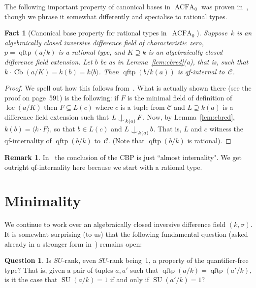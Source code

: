 \documentclass[\DocOpts]{amsart}
\newtheorem{fact}[theorem]{Fact}
\theoremstyle{definition}
\newtheorem{remark}[theorem]{Remark}
\newtheorem{question}[theorem]{Question}
\def\acfa{\operatorname{ACFA}}
\def\cb{\operatorname{Cb}}
\def\qftp{\operatorname{qftp}}
\def\loc{\operatorname{loc}}
\def\su{\operatorname{SU}}
\def\C{\mathcal{C}}
\newcommand{\<}{\langle}
\renewcommand{\>}{\rangle}
\def\Ind#1#2{#1\setbox0=\hbox{\(#1x\)}\kern\wd0\hbox to 
0pt{\hss\(#1\mid\)\hss}\lower.9\ht0\hbox to 
0pt{\hss\(#1\smile\)\hss}\kern\wd0}
\def\ind{\mathop{\mathpalette\Ind{}}}
\begin{document}
The following important property of canonical bases in $\acfa_0$ was proven in~\cite{pillay-ziegler}, though we phrase it somewhat differently and specialise to rational types.

\begin{fact}[Canonical base property for rational types in~$\acfa_0$]
\label{fact:cbp}
Suppose~$k$ is an algebraically closed inversive difference field of characteristic zero, $p=\qftp(a/k)$ is a rational type, and $K\supseteq k$ is an algebraically closed difference field extension.
Let $b$ be as in Lemma~\ref{lem:cbred}(a), that is, such that
$k\cdot\cb(a/K)=k(b)=k\langle b\rangle$.
Then $\qftp(b/k(a))$ is qf-internal to~$\C$.
\end{fact}

\begin{proof}
We spell out how this follows from~\cite[Theorem~1.2]{pillay-ziegler}.
What is actually shown there (see the proof on page~591) is the following: if $F$ is the minimal field of definition of $\loc(a/K)$ then $F\subseteq L(c)$ where $c$ is a tuple from $\C$ and $L\supseteq k(a)$ is a difference field extension such that $L\ind_{k(a)}F$.
Now, by Lemma~\ref{lem:cbred}, $k(b)=\langle k\cdot F\rangle$, so that $b\in L(c)$ and $L\ind_{k(a)}b$.
That is, $L$ and $c$ witness the qf-internality of $\qftp(b/k)$ to~$\C$.
(Note that $\qftp(b/k)$ is rational).
\end{proof}

\begin{remark}
In~\cite{pillay-ziegler} the conclusion of the CBP is just ``almost internality".
We get outright qf-internality here because we start with a rational type.
\end{remark}

\bigskip
\section{Minimality}
\label{sect:qfmin}

\noindent
We continue to work over an algebraically closed inversive difference field $(k,\sigma)$.
It is somewhat surprising (to us) that the following fundamental question (asked already in a stronger form in~\cite[Remark~1.15]{acfa2}) remains open:

\begin{question}
\label{question:qfmin=min}
Is $SU$-rank, even $SU$-rank being~$1$, a property of the quantifier-free type?
That is, given a pair of tuples $a,a'$ such that $\qftp(a/k)=\qftp(a'/k)$, is it the case that $\su(a/k)=1$ if and only if $\su(a'/k)=1$?
\end{question}
\end{document}
